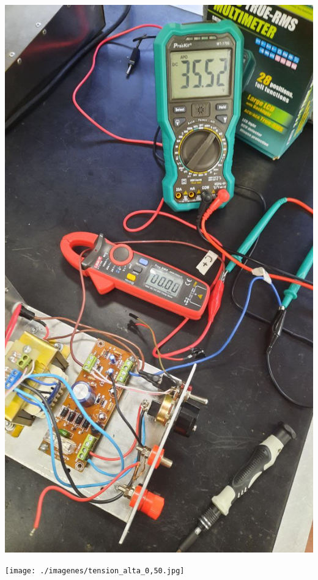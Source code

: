 
\begin{center}
    \centering
    \includegraphics[width=0.9\linewidth]{./imagenes/tension_alta_vacio_rao.jpg}
\end{center}


\begin{center}
    \centering
    \texttt{[image: ./imagenes/tension\_alta\_0,50.jpg]}
\end{center}

\saltoPag{}

